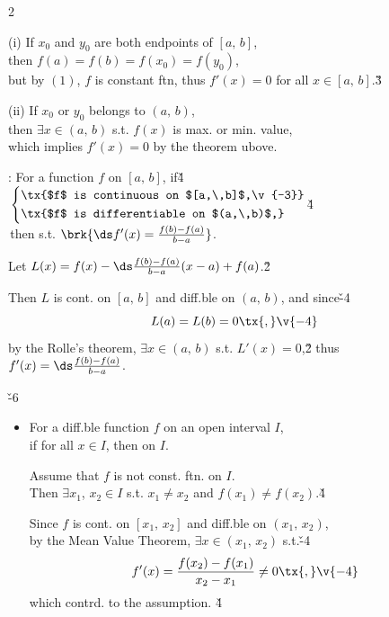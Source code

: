 \documentclass[dvipdfmx,a4paper,titlepage,9pt]{jsarticle}
\begin{document}
\begin{multicols*}{2}
\begin{Pfbox}
(i) If $x_0$ and $y_0$ are both endpoints of $[a,\,b]$,\\
then $f(a)=f(b)=f(x_0)=f(y_0)$,\\
but by $(1)$, $f$ is constant ftn, thus $f'(x)=0$ for all $x\in[a,\,b]$.\v3

(ii) If $x_0$ or $y_0$ belongs to $(a,\,b)$,\\
then $\exists x\in(a,\,b)$ s.t. $f(x)$ is max. or min. value,\\
which implies $f'(x)=0$ by the theorem ubove.
\end{Pfbox}\;

\vfill\null\columnbreak


: For a function $f$ on $[a,\,b]$, if\v4\\
\;\;\;\;\;\,$\left\{\begin{aligned}&\tx{$f$ is continuous on $[a,\,b]$,\v{-3}}\\&\tx{$f$ is differentiable on $(a,\,b)$,}\end{aligned}\right.$\v4\\
\;\;\;\;\;\,then  s.t. $\brk{\ds f'(x)=\frac{f(b)-f(a)}{b-a}}$.

\begin{Pfbox}
Let $L(x)=f(x)-\ds\frac{f(b)-f(a)}{b-a}(x-a)+f(a)$.\v2

Then $L$ is cont. on $[a,\,b]$ and diff.ble on $(a,\,b)$, and since\v{-4}
$$L(a)=L(b)=0\tx{,}\v{-4}$$
by the Rolle's theorem, $\exists x\in(a,\,b)$ s.t. $L'(x)=0$,\v2
thus\\ $f'(x)=\ds\frac{f(b)-f(a)}{b-a}$.
\end{Pfbox}\;

\v{-6}
\begin{itemize}[label={-}]
\item For a diff.ble function $f$ on an open interval $I$,\\
if  for all $x\in I$, then  on $I$.

\begin{Pfbox}
Assume that $f$ is not const. ftn. on $I$.\\
Then $\exists x_1$, $x_2\in I$ s.t. $x_1\neq x_2$ and $f(x_1)\neq f(x_2)$.\v4

Since $f$ is cont. on $[x_1,\,x_2]$ and diff.ble on $(x_1,\,x_2)$,\\
by the Mean Value Theorem, $\exists x\in(x_1,\,x_2)$ s.t.\v{-4}
$$f'(x)=\frac{f(x_2)-f(x_1)}{x_2-x_1}\neq0\tx{,}\v{-4}$$
which contrd. to the assumption. \v4


\end{Pfbox}
\end{itemize}
\end{multicols*}
\end{document}
